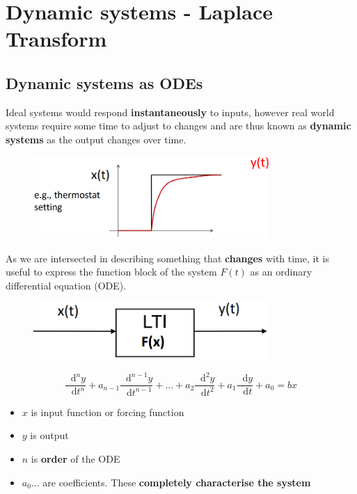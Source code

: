 \documentclass[class=report, crop=false, 12pt,a4paper, tikz, border=4mm]{standalone}
\newcommand{\dif}{\mathop{}\!\mathrm{d}}
\begin{document}
\section{Dynamic systems - Laplace Transform}
\subsection{Dynamic systems as ODEs}
Ideal systems would respond \textbf{instantaneously} to inputs, however real world systems require some time to adjust to changes and are thus known as \textbf{dynamic systems} as the output changes over time.
\begin{figure}[H]
  \centering
  \includegraphics[width = 0.8\textwidth]{../img/graphs5.png}
\end{figure}
As we are intersected in describing something that \textbf{changes} with time, it is useful to express the function block of the system $F(t)$ as an ordinary differential equation (ODE).
\begin{figure}[H]
  \centering
  \includegraphics[width = 0.8\textwidth]{../img/blockdiagram10.png}
\end{figure}
\begin{equation}
  \frac{\dif^n y}{\dif t^n} + a_{n-1}\frac{\dif^{n-1}y}{\dif t^{n-1}} + ... + a_2 \frac{\dif^2y}{\dif t^2} + a_1 \frac{\dif y}{\dif t} + a_0 = bx
\end{equation}
\begin{itemize}
  \item $x$ is input function or forcing function
  \item $y$ is output
  \item $n$ is \textbf{order} of the ODE
  \item $a_0...$ are coefficients. These \textbf{completely characterise the system}
\end{itemize}
\end{document}
